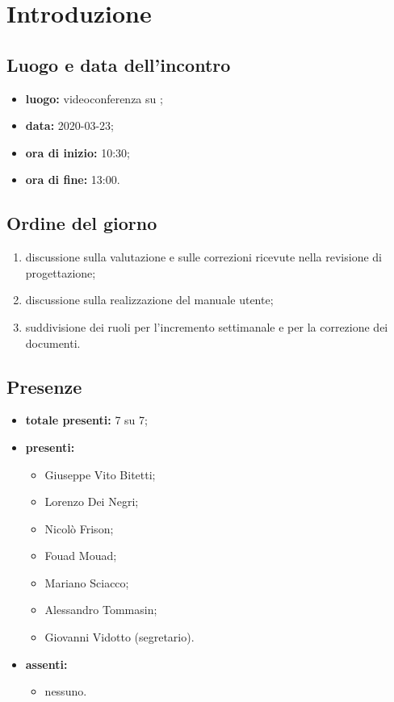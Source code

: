 \section*{Introduzione}

\subsection*{Luogo e data dell'incontro}
	\begin{itemize}
		\item \textbf{luogo:} videoconferenza su ;
		\item \textbf{data:} 2020-03-23;
		\item \textbf{ora di inizio:} 10:30;
		\item \textbf{ora di fine:} 13:00.
	\end{itemize}

\subsection*{Ordine del giorno}
	\begin{enumerate}
			\item discussione sulla valutazione e sulle correzioni ricevute nella revisione di progettazione;
			\item discussione sulla realizzazione del manuale utente;
			\item suddivisione dei ruoli per l'incremento settimanale e per la correzione dei documenti.
	\end{enumerate}

\subsection*{Presenze}
	\begin{itemize}
		\item \textbf{totale presenti:} 7 su 7;
		\item \textbf{presenti: }
			\begin{itemize}
				\item Giuseppe Vito Bitetti;
				\item Lorenzo Dei Negri;
				\item Nicolò Frison;
				\item Fouad Mouad;
				\item Mariano Sciacco;
				\item Alessandro Tommasin;
				\item Giovanni Vidotto (segretario).
			\end{itemize}
		\item \textbf{assenti: }
			\begin{itemize}
				\item nessuno.
			\end{itemize}
	\end{itemize}


